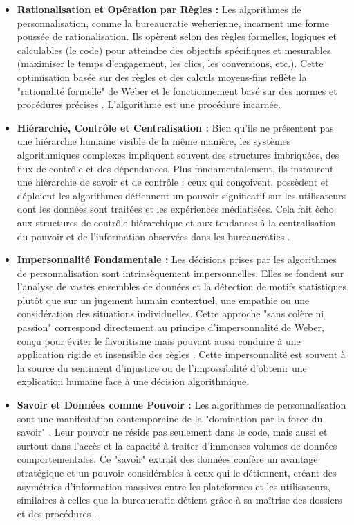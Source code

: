 \documentclass[10pt, twocolumn]{article}
\begin{document}
\begin{itemize}
    \item \textbf{Rationalisation et Opération par Règles :} Les algorithmes de personnalisation, comme la bureaucratie weberienne, incarnent une forme poussée de rationalisation. Ils opèrent selon des règles formelles, logiques et calculables (le code) pour atteindre des objectifs spécifiques et mesurables (maximiser le temps d'engagement, les clics, les conversions, etc.). Cette optimisation basée sur des règles et des calculs moyens-fins \citep{Serpa2019} reflète la "rationalité formelle" de Weber et le fonctionnement basé sur des normes et procédures précises \citep{Serpa2019, Weber1922}. L'algorithme est une procédure incarnée.
    \item \textbf{Hiérarchie, Contrôle et Centralisation :} Bien qu'ils ne présentent pas une hiérarchie humaine visible de la même manière, les systèmes algorithmiques complexes impliquent souvent des structures imbriquées, des flux de contrôle et des dépendances. Plus fondamentalement, ils instaurent une hiérarchie de savoir et de contrôle : ceux qui conçoivent, possèdent et déploient les algorithmes détiennent un pouvoir significatif sur les utilisateurs dont les données sont traitées et les expériences médiatisées. Cela fait écho aux structures de contrôle hiérarchique \citep{Weber1922} et aux tendances à la centralisation du pouvoir et de l'information observées dans les bureaucraties \citep{Weber1922, Hussain2019}.
    \item \textbf{Impersonnalité Fondamentale :} Les décisions prises par les algorithmes de personnalisation sont intrinsèquement impersonnelles. Elles se fondent sur l'analyse de vastes ensembles de données et la détection de motifs statistiques, plutôt que sur un jugement humain contextuel, une empathie ou une considération des situations individuelles. Cette approche "sans colère ni passion" correspond directement au principe d'impersonnalité de Weber, conçu pour éviter le favoritisme mais pouvant aussi conduire à une application rigide et insensible des règles \citep{Weber1922, Laguito2024}. Cette impersonnalité est souvent à la source du sentiment d'injustice ou de l'impossibilité d'obtenir une explication humaine face à une décision algorithmique.
    \item \textbf{Savoir et Données comme Pouvoir :} Les algorithmes de personnalisation sont une manifestation contemporaine de la "domination par la force du savoir" \citep{Weber1922}. Leur pouvoir ne réside pas seulement dans le code, mais aussi et surtout dans l'accès et la capacité à traiter d'immenses volumes de données comportementales. Ce "savoir" extrait des données confère un avantage stratégique et un pouvoir considérables à ceux qui le détiennent, créant des asymétries d'information massives entre les plateformes et les utilisateurs, similaires à celles que la bureaucratie détient grâce à sa maîtrise des dossiers et des procédures \citep{Jaelani2024}.

\end{itemize}
\end{document}
